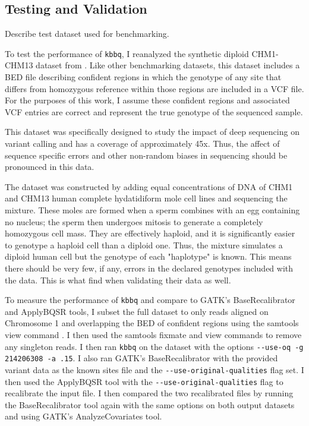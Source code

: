 \documentclass{article}
\begin{document}
\subsection{Testing and Validation}
\begin{outline}
	\item Describe test dataset used for benchmarking.
	\begin{outline}
		\item To test the performance of \texttt{kbbq}, I reanalyzed the synthetic diploid CHM1-CHM13 dataset from \cite{li_synthetic-diploid_2018}. Like other benchmarking datasets, this dataset includes a BED file describing confident regions in which the genotype of any site that differs from homozygous reference within those regions are included in a VCF file. For the purposes of this work, I assume these confident regions and associated VCF entries are correct and represent the true genotype of the sequenced sample.
		\item This dataset was specifically designed to study the impact of deep sequencing on variant calling and has a coverage of approximately 45x. Thus, the affect of sequence specific errors and other non-random biases in sequencing should be pronounced in this data.
		\item The dataset was constructed by adding equal concentrations of DNA of CHM1 and CHM13 human complete hydatidiform mole cell lines and sequencing the mixture. These moles are formed when a sperm combines with an egg containing no nucleus; the sperm then undergoes mitosis to generate a completely homozygous cell mass. They are effectively haploid, and it is significantly easier to genotype a haploid cell than a diploid one. Thus, the mixture simulates a diploid human cell but the genotype of each "haplotype" is known. This means there should be very few, if any, errors in the declared genotypes included with the data. This is what \cite{li_synthetic-diploid_2018} find when validating their data as well.
		\item To measure the performance of \texttt{kbbq} and compare to GATK's BaseRecalibrator and ApplyBQSR tools, I subset the full dataset to only reads aligned on Chromosome 1 and overlapping the BED of confident regions using the samtools view command \parencite{li_sequence_2009}. I then used the samtools fixmate and view commands to remove any singleton reads. I then ran \texttt{kbbq} on the dataset with the options \texttt{-\phantom{}-use-oq -g 214206308 -a .15}. I also ran GATK's BaseRecalibrator with the provided variant data as the known sites file and the \texttt{-\phantom{}-use-original-qualities} flag set. I then used the ApplyBQSR tool with the \texttt{-\phantom{}-use-original-qualities} flag to recalibrate the input file. I then compared the two recalibrated files by running the BaseRecalibrator tool again with the same options on both output datasets and using GATK's AnalyzeCovariates tool.

\end{outline}
\end{outline}
\end{document}
